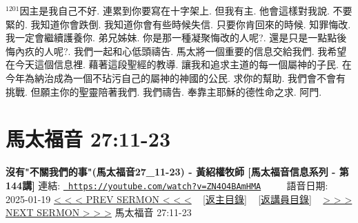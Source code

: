 \documentclass{book}
\begin{document}
$^{1201}$因主是我自己不好.
連累到你要寫在十字架上.
但我有主.
他會這樣對我說.
不要緊的.
我知道你會跌倒.
我知道你會有些時候失信.
只要你肯回來的時候.
知罪悔改.
我一定會繼續護養你.
弟兄姊妹.
你是那一種凝聚悔改的人呢?.
還是只是一點點後悔內疚的人呢?.
我們一起和心低頭禱告.
馬太將一個重要的信息交給我們.
我希望在今天這個信息裡.
藉著這段聖經的教導.
讓我和追求主道的每一個屬神的子民.
在今年為納治成為一個不玷污自己的屬神的神國的公民.
求你的幫助.
我們會不會有挑戰.
但願主你的聖靈陪著我們.
我們禱告.
奉靠主耶穌的德性命之求.
阿門.
\newpage



\section{馬太福音 27:11-23}
\label{sec:ZN4O4BAmHMA}
\textbf{沒有"不關我們的事"(馬太福音27\_11-23) -  黃紹權牧師 [馬太福音信息系列 - 第144講]}
\newline
\newline
連結: \href{https://youtube.com/watch?v=ZN4O4BAmHMA}{\texttt{ https://youtube.com/watch?v=ZN4O4BAmHMA}} ~~~~ 語音日期: 2025-01-19 
\newline
\newline
\hyperref[sec:499K9je19EI]{< < < PREV SERMON < < <}
~
\hyperlink{toc}{[返主目錄]}
~
\hyperref[ch:preacher15]{[返講員目錄]}
~
\hyperref[sec:HaaLhKYBRSg]{> > > NEXT SERMON > > >}
\newline
\newline
馬太福音 27:11-23
\newline
\end{document}
